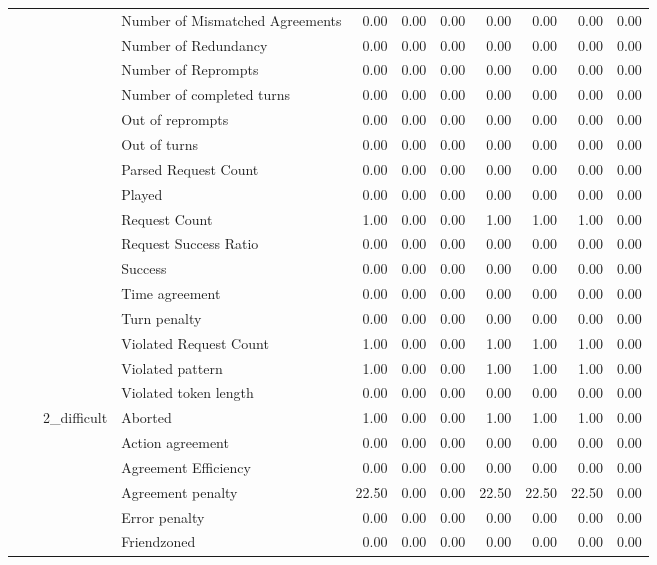\begin{tabular}{llllrrrrrrr}
 &  &  & Number of Mismatched Agreements & 0.00 & 0.00 & 0.00 & 0.00 & 0.00 & 0.00 & 0.00 \\
 &  &  & Number of Redundancy & 0.00 & 0.00 & 0.00 & 0.00 & 0.00 & 0.00 & 0.00 \\
 &  &  & Number of Reprompts & 0.00 & 0.00 & 0.00 & 0.00 & 0.00 & 0.00 & 0.00 \\
 &  &  & Number of completed turns & 0.00 & 0.00 & 0.00 & 0.00 & 0.00 & 0.00 & 0.00 \\
 &  &  & Out of reprompts & 0.00 & 0.00 & 0.00 & 0.00 & 0.00 & 0.00 & 0.00 \\
 &  &  & Out of turns & 0.00 & 0.00 & 0.00 & 0.00 & 0.00 & 0.00 & 0.00 \\
 &  &  & Parsed Request Count & 0.00 & 0.00 & 0.00 & 0.00 & 0.00 & 0.00 & 0.00 \\
 &  &  & Played & 0.00 & 0.00 & 0.00 & 0.00 & 0.00 & 0.00 & 0.00 \\
 &  &  & Request Count & 1.00 & 0.00 & 0.00 & 1.00 & 1.00 & 1.00 & 0.00 \\
 &  &  & Request Success Ratio & 0.00 & 0.00 & 0.00 & 0.00 & 0.00 & 0.00 & 0.00 \\
 &  &  & Success & 0.00 & 0.00 & 0.00 & 0.00 & 0.00 & 0.00 & 0.00 \\
 &  &  & Time agreement & 0.00 & 0.00 & 0.00 & 0.00 & 0.00 & 0.00 & 0.00 \\
 &  &  & Turn penalty & 0.00 & 0.00 & 0.00 & 0.00 & 0.00 & 0.00 & 0.00 \\
 &  &  & Violated Request Count & 1.00 & 0.00 & 0.00 & 1.00 & 1.00 & 1.00 & 0.00 \\
 &  &  & Violated pattern & 1.00 & 0.00 & 0.00 & 1.00 & 1.00 & 1.00 & 0.00 \\
 &  &  & Violated token length & 0.00 & 0.00 & 0.00 & 0.00 & 0.00 & 0.00 & 0.00 \\
\cline{3-11}
 &  & \multirow[t]{27}{*}{2_difficult} & Aborted & 1.00 & 0.00 & 0.00 & 1.00 & 1.00 & 1.00 & 0.00 \\
 &  &  & Action agreement & 0.00 & 0.00 & 0.00 & 0.00 & 0.00 & 0.00 & 0.00 \\
 &  &  & Agreement Efficiency & 0.00 & 0.00 & 0.00 & 0.00 & 0.00 & 0.00 & 0.00 \\
 &  &  & Agreement penalty & 22.50 & 0.00 & 0.00 & 22.50 & 22.50 & 22.50 & 0.00 \\
 &  &  & Error penalty & 0.00 & 0.00 & 0.00 & 0.00 & 0.00 & 0.00 & 0.00 \\
 &  &  & Friendzoned & 0.00 & 0.00 & 0.00 & 0.00 & 0.00 & 0.00 & 0.00 \\

\end{tabular}

